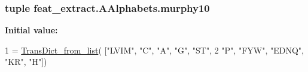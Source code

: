 \subsubsection[{murphy10}]{\setlength{\rightskip}{0pt plus 5cm}tuple feat\+\_\+extract.\+A\+Alphabets.\+murphy10}\label{namespacefeat__extract_1_1_a_alphabets_afc9c9f0083238e1c856dc8b7b0038cb4}
{\bfseries Initial value\+:}
\begin{DoxyCode}
1 = \hyperlink{namespacefeat__extract_1_1_a_alphabets_acdda8523b57175e0e79064c4da723c5d}{TransDict\_from\_list}(  [\textcolor{stringliteral}{"LVIM"}, \textcolor{stringliteral}{"C"}, \textcolor{stringliteral}{"A"}, \textcolor{stringliteral}{"G"}, \textcolor{stringliteral}{"ST"},
2  \textcolor{stringliteral}{"P"}, \textcolor{stringliteral}{"FYW"}, \textcolor{stringliteral}{"EDNQ"}, \textcolor{stringliteral}{"KR"}, \textcolor{stringliteral}{"H"}])
\end{DoxyCode}
\hypertarget{namespacefeat__extract_1_1_a_alphabets_a68dfc38ccacb5ac3e436cc63935dc1c8}{}

